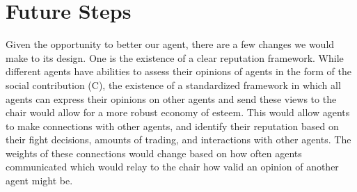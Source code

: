 \section{Future Steps}

\par Given the opportunity to better our agent, there are a few changes we would make to its design. One is the existence of a clear reputation framework. While different agents have abilities to assess their opinions of agents in the form of the social contribution (C), the existence of a standardized framework in which all agents can express their opinions on other agents and send these views to the chair would allow for a more robust economy of esteem. This would allow agents to make connections with other agents, and identify their reputation based on their fight decisions, amounts of trading, and interactions with other agents. The weights of these connections would change based on how often agents communicated which would relay to the chair how valid an opinion of another agent might be. 


